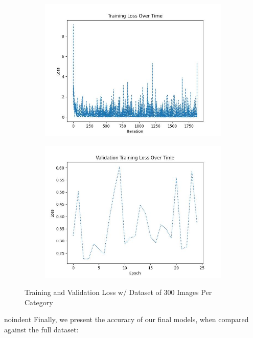 \documentclass{article}
\begin{document}
\begin{figure}[H]
    \centering
    \begin{subfigure}{0.4\textwidth}
        \centering
        \includegraphics[width = \textwidth]{imgs/loss/loss_plot_300.jpg}
    \end{subfigure}
    \begin{subfigure}{0.4\textwidth}
        \centering
        \includegraphics[width = \textwidth]{imgs/loss/validation_loss_plot_300.jpg}
    \end{subfigure}
    \caption{Training and Validation Loss w/ Dataset of 300 Images Per Category}
\end{figure}
noindent Finally, we present the accuracy of our final models, when compared against the full dataset:
\end{document}
